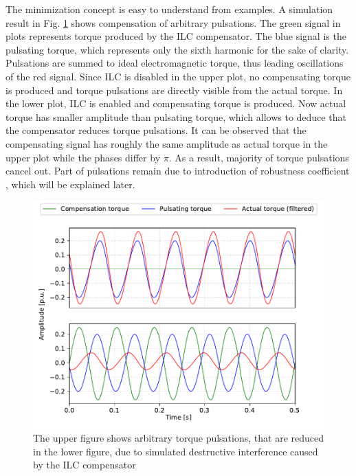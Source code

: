 The minimization concept is easy to understand from examples. A simulation result in Fig. \ref{fig:ilc_concept} shows compensation of arbitrary pulsations. The green signal in plots represents torque produced by the ILC compensator. The blue signal is the pulsating torque, which represents only the sixth harmonic for the sake of clarity. Pulsations are summed to ideal electromagnetic torque, thus leading oscillations of the red signal. Since ILC is disabled in the upper plot, no compensating torque is produced and torque pulsations are directly visible from the actual torque. In the lower plot, ILC is enabled and compensating torque is produced. Now actual torque has smaller amplitude than pulsating torque, which allows to deduce that the compensator reduces torque pulsations. It can be observed that the compensating signal has roughly the same amplitude as actual torque in the upper plot while the phases differ by $\pi$. As a result, majority of torque pulsations cancel out. Part of pulsations remain due to introduction of robustness coefficient \cite{ILC:1990, ILC:2004, ILC:2005}, which will be explained later.
\begin{figure}[htb] 
    \centering
    \includegraphics[width=\textwidth]{images/ilc-concept.pdf}
    \caption{The upper figure shows arbitrary torque pulsations, that are reduced in the lower figure, due to simulated destructive interference caused by the ILC compensator}
    \label{fig:ilc_concept}
\end{figure}

